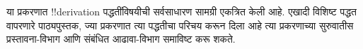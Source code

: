 \documentclass[../../../include/open-logic-chapter]{subfiles}
\begin{document}
      {}
      {}

\begin{editorial}
या प्रकरणात !!{derivation} पद्धतींविषयीची सर्वसाधारण सामग्री
एकत्रित केली आहे. एखादी विशिष्ट पद्धत वापरणारे पाठ्यपुस्तक,
ज्या प्रकरणात त्या पद्धतीचा परिचय करून दिला आहे त्या प्रकरणाच्या
सुरुवातीस प्रस्तावना-विभाग आणि संबंधित आढावा-विभाग समाविष्ट करू शकते.
\end{editorial}






\OLEndChapterHook
\end{document}
